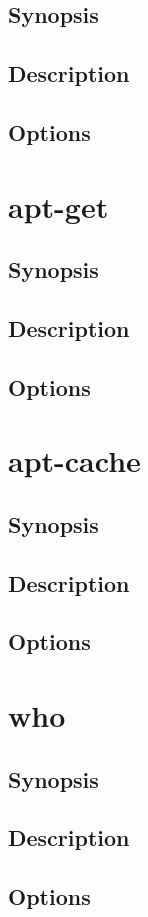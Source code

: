 \documentclass[a4paper, 10pt, onecolumn, openright, oneside]{book}
\begin{document}
			\subsection{Synopsis}
			\subsection{Description}
			\subsection{Options}
		\section{apt-get}
			\subsection{Synopsis}
			\subsection{Description}
			\subsection{Options}
		\section{apt-cache}
			\subsection{Synopsis}
			\subsection{Description}
			\subsection{Options}
		\section{who}
			\subsection{Synopsis}
			\subsection{Description}
			\subsection{Options}
\end{document}
